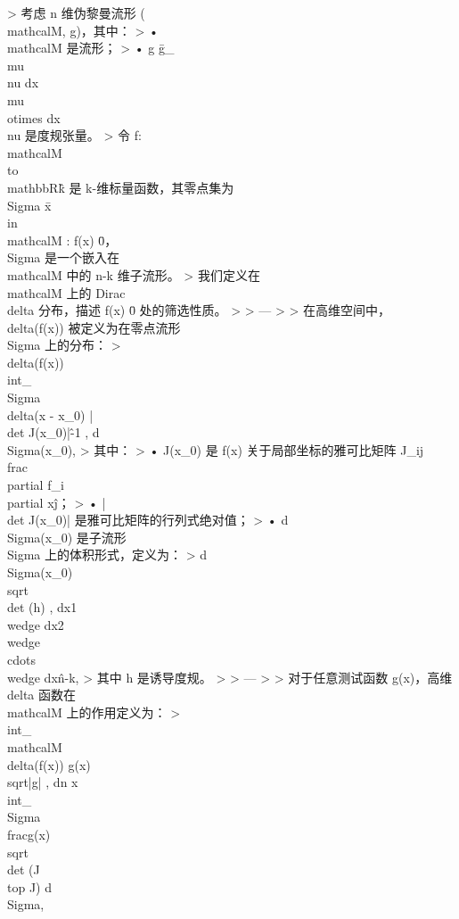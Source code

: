 \documentclass[lang=cn,10pt,newtx,bibend=biber,device=pad]{elegantbook}
\begin{document}
> 考虑 n 维伪黎曼流形 (\\mathcal{M}, g)，其中：  
> 	•	\\mathcal{M} 是流形；  
> 	•	g \= g\_{\\mu\\nu} dx\\mu \\otimes dx\\nu 是度规张量。  
> 令 f: \\mathcal{M} \\to \\mathbb{R}\^k 是 k-维标量函数，其零点集为 \\Sigma \= {x \\in \\mathcal{M} : f(x) \= 0}，\\Sigma 是一个嵌入在 \\mathcal{M} 中的 n-k 维子流形。  
> 我们定义在 \\mathcal{M} 上的 Dirac \\delta 分布，描述 f(x) \= 0 处的筛选性质。
>
> ---
>
> 在高维空间中，\\delta(f(x)) 被定义为在零点流形 \\Sigma 上的分布：  
> \\delta(f(x)) \= \\int\_{\\Sigma} \\delta(x - x\_0) |\\det J(x\_0)|\^{-1} , d\\Sigma(x\_0),  
> 其中：  
> 	•	J(x\_0) 是 f(x) 关于局部坐标的雅可比矩阵 J\_{ij} \= \\frac{\\partial f\_i}{\\partial x\^j}；  
> 	•	|\\det J(x\_0)| 是雅可比矩阵的行列式绝对值；  
> 	•	d\\Sigma(x\_0) 是子流形 \\Sigma 上的体积形式，定义为：  
> d\\Sigma(x\_0) \= \\sqrt{\\det (h)} , dx1 \\wedge dx2 \\wedge \\cdots \\wedge dx\^{n-k},  
> 其中 h 是诱导度规。
>
> ---
>
> 对于任意测试函数 g(x)，高维 \\delta 函数在 \\mathcal{M} 上的作用定义为：  
> \\int\_{\\mathcal{M}} \\delta(f(x)) g(x) \\sqrt{|g|} , dn x \= \\int\_\\Sigma \\frac{g(x)}{\\sqrt{\\det (J\\top J)}} d\\Sigma,  
\end{document}
